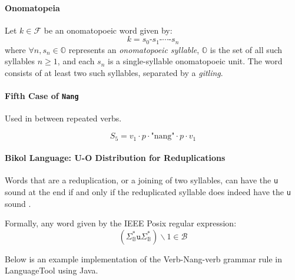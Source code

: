 \paragraph{Onomatopeia} Let \( k \in \mathcal{F} \) be an onomatopoeic word given by:
\[
      k = s_0\texttt{-}s_1\texttt{-}\cdots\texttt{-}s_n 
\]
where \(\forall n, s_n \in \mathbb{O} \) represents an \textit{onomatopoeic syllable}, \( \mathbb{O} \) is the set of all such syllables \( n \geq 1 \), and each \( s_n \) is a single-syllable onomatopoeic unit. The word consists of at least two such syllables, separated by a \textit{gitling}.

\paragraph{Fifth Case of \texttt{Nang}} Used in between repeated verbs.

\[
      S_5 = v_1 \cdot p \cdot \text{"nang"} \cdot p \cdot v_1
\]

\paragraph{Bikol Language: U-O Distribution for Reduplications}
Words that are a reduplication, or a joining of two syllables, can have the \texttt{u} sound at the end if and only if the reduplicated syllable does indeed have the \texttt{u} sound \cite{bikol_dictionary}.

Formally, any word given by the IEEE Posix regular expression:
\[
      \left( \Sigma_\mathbb{B}^*\texttt{u}\Sigma_\mathbb{B}^* \right)\backslash1 \in \mathcal{B}
\]

Below is an example implementation of the Verb-Nang-verb grammar rule in LanguageTool using Java.

